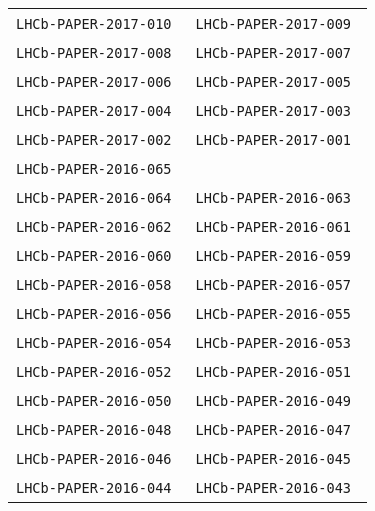 \begin{center}
\begin{longtable}{ll}
\texttt{LHCb-PAPER-2017-010}~\cite{LHCb-PAPER-2017-010} &
\texttt{LHCb-PAPER-2017-009}~\cite{LHCb-PAPER-2017-009} \\
\texttt{LHCb-PAPER-2017-008}~\cite{LHCb-PAPER-2017-008} &
\texttt{LHCb-PAPER-2017-007}~\cite{LHCb-PAPER-2017-007} \\
\texttt{LHCb-PAPER-2017-006}~\cite{LHCb-PAPER-2017-006} &
\texttt{LHCb-PAPER-2017-005}~\cite{LHCb-PAPER-2017-005} \\
\texttt{LHCb-PAPER-2017-004}~\cite{LHCb-PAPER-2017-004} &
\texttt{LHCb-PAPER-2017-003}~\cite{LHCb-PAPER-2017-003} \\
\texttt{LHCb-PAPER-2017-002}~\cite{LHCb-PAPER-2017-002} &
\texttt{LHCb-PAPER-2017-001}~\cite{LHCb-PAPER-2017-001} \\
\midrule
\texttt{LHCb-PAPER-2016-065}~\cite{LHCb-PAPER-2016-065} & 
                                                        \\
\texttt{LHCb-PAPER-2016-064}~\cite{LHCb-PAPER-2016-064} & 
\texttt{LHCb-PAPER-2016-063}~\cite{LHCb-PAPER-2016-063} \\
\texttt{LHCb-PAPER-2016-062}~\cite{LHCb-PAPER-2016-062} & 
\texttt{LHCb-PAPER-2016-061}~\cite{LHCb-PAPER-2016-061} \\
\texttt{LHCb-PAPER-2016-060}~\cite{LHCb-PAPER-2016-060} & 
\texttt{LHCb-PAPER-2016-059}~\cite{LHCb-PAPER-2016-059} \\
\texttt{LHCb-PAPER-2016-058}~\cite{LHCb-PAPER-2016-058} & 
\texttt{LHCb-PAPER-2016-057}~\cite{LHCb-PAPER-2016-057} \\
\texttt{LHCb-PAPER-2016-056}~\cite{LHCb-PAPER-2016-056} & 
\texttt{LHCb-PAPER-2016-055}~\cite{LHCb-PAPER-2016-055} \\
\texttt{LHCb-PAPER-2016-054}~\cite{LHCb-PAPER-2016-054} & 
\texttt{LHCb-PAPER-2016-053}~\cite{LHCb-PAPER-2016-053} \\
\texttt{LHCb-PAPER-2016-052}~\cite{LHCb-PAPER-2016-052} & 
\texttt{LHCb-PAPER-2016-051}~\cite{LHCb-PAPER-2016-051} \\
\texttt{LHCb-PAPER-2016-050}~\cite{LHCb-PAPER-2016-050} & 
\texttt{LHCb-PAPER-2016-049}~\cite{LHCb-PAPER-2016-049} \\
\texttt{LHCb-PAPER-2016-048}~\cite{LHCb-PAPER-2016-048} & 
\texttt{LHCb-PAPER-2016-047}~\cite{LHCb-PAPER-2016-047} \\
\texttt{LHCb-PAPER-2016-046}~\cite{LHCb-PAPER-2016-046} & 
\texttt{LHCb-PAPER-2016-045}~\cite{LHCb-PAPER-2016-045} \\
\texttt{LHCb-PAPER-2016-044}~\cite{LHCb-PAPER-2016-044} & 
\texttt{LHCb-PAPER-2016-043}~\cite{LHCb-PAPER-2016-043} \\

\end{longtable}
\end{center}
